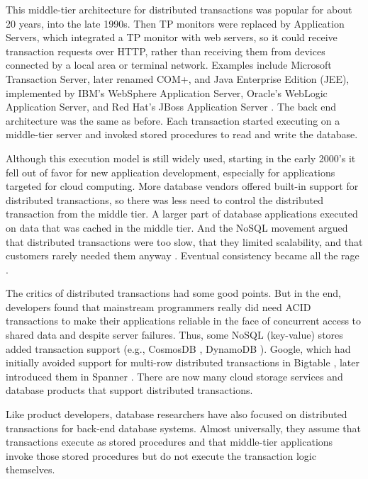 \documentclass[11pt]{article}
\begin{document}
This middle-tier architecture for distributed transactions was popular for about 20 years, into the late 1990s. Then TP monitors were replaced by Application Servers, which integrated a TP monitor with web servers, so it could receive transaction requests over HTTP, rather than receiving them from devices connected by a local area or terminal network. Examples include Microsoft Transaction Server, later renamed COM+, and Java Enterprise Edition (JEE), implemented by IBM's WebSphere Application Server, Oracle's WebLogic Application Server, and Red Hat's JBoss Application Server \cite{12}. The back end architecture was the same as before. Each transaction started executing on a middle-tier server and invoked stored procedures to read and write the database. 
 
Although this execution model is still widely used, starting in the early 2000's it fell out of favor for new application development, especially for applications targeted for cloud computing. More database vendors offered built-in support for distributed transactions, so there was less need to control the distributed transaction from the middle tier. A larger part of database applications executed on data that was cached in the middle tier. And the NoSQL movement argued that distributed transactions were too slow, that they limited scalability, and that customers rarely needed them anyway \cite{11}. Eventual consistency became all the rage \cite{19}. 
 
The critics of distributed transactions had some good points. But in the end, developers found that mainstream programmers really did need ACID transactions to make their applications reliable in the face of concurrent access to shared data and despite server failures. Thus, some NoSQL (key-value) stores added transaction support (e.g., CosmosDB \cite{2}, DynamoDB \cite{8}). Google, which had initially avoided support for multi-row distributed transactions in Bigtable \cite{5}, later introduced them in Spanner \cite{6}. There are now many cloud storage services and database products that support distributed transactions. 
 
Like product developers, database researchers have also focused on distributed transactions for back-end database systems. Almost universally, they assume that transactions execute as stored procedures and that middle-tier applications invoke those stored procedures but do not execute the transaction logic themselves. 
 
\end{document}
